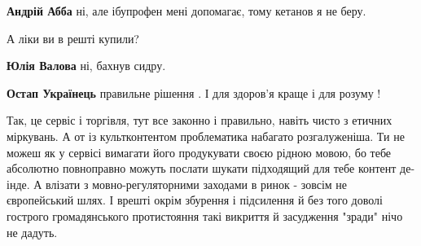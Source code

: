 \begin{itemize}
\begin{itemize}
\textbf{Андрій Абба} ні, але ібупрофен мені допомагає, тому кетанов я не беру.
\end{itemize}

 
А ліки ви в решті купили?

\begin{itemize}
 
\textbf{Юлія Валова} ні, бахнув сидру.

 
\textbf{Остап Українець} правильне рішення . І для здоров’я краще і для розуму !
\end{itemize}

 

Так, це сервіс і торгівля, тут все законно і правильно, навіть чисто з етичних
міркувань. А от із культконтентом проблематика набагато розгалуженіша. Ти не
можеш як у сервісі вимагати його продукувати своєю рідною мовою, бо тебе
абсолютно повноправно можуть послати шукати підходящий для тебе контент
де-інде. А влізати з мовно-регуляторними заходами в ринок - зовсім не
європейський шлях. І врешті окрім збурення і підсилення й без того доволі
гострого громадянського протистояння такі викриття й засудження "зради" нічо не
дадуть.

\begin{itemize}
 

\end{itemize}
\end{itemize}
